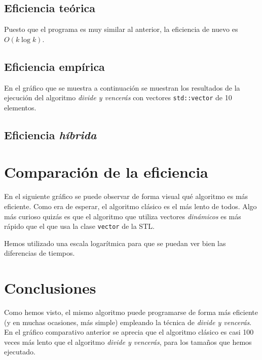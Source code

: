 \documentclass[11pt]{article}
\begin{document}


\subsection*{Eficiencia teórica}

Puesto que el programa es muy similar al anterior, la eficiencia de nuevo es $O(k\log k)$.

\subsection*{Eficiencia empírica}

En el gráfico que se muestra a continuación se muestran los resultados de la
ejecución del algoritmo \textit{divide y vencerás} con vectores
\texttt{std::vector} de 10 elementos.

\begin{center}
	
\end{center}

\subsection*{Eficiencia \textit{híbrida}}

\section*{Comparación de la eficiencia}

En el siguiente gráfico se puede observar de forma visual qué algoritmo es más
eficiente. Como era de esperar, el algoritmo clásico es el más lento de
todos. Algo más curioso quizás es que el algoritmo que utiliza vectores
\textit{dinámicos} es más rápido que el que usa la clase \texttt{vector} de la STL.

\begin{center}
	
\end{center}

Hemos utilizado una escala logarítmica para que se puedan ver bien las diferencias de tiempos.

\section*{Conclusiones}

Como hemos visto, el mismo algoritmo puede programarse de forma más eficiente (y en muchas ocasiones, más simple) empleando la técnica de \textit{divide y vencerás}. En el gráfico comparativo anterior se aprecia que el algoritmo clásico es casi 100 veces más lento que el algoritmo \textit{divide y vencerás}, para los tamaños que hemos ejecutado.
\end{document}
